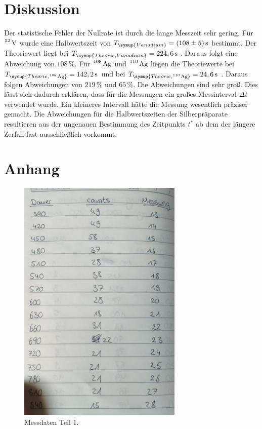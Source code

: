 \section{Diskussion}
\label{sec:Diskussion}
Der statistische Fehler der Nullrate ist durch die lange Messzeit sehr gering. Für $\ce{^52 V}$ wurde eine
Halbwertszeit von $T_{\symup{Vanadium}} = (108 \pm 5)\,\unit{\second}$ bestimmt. Der Theoriewert liegt bei
$T_{\symup{Theorie, Vanadium}} = 224,6\,\unit{\second}$ \cite{periodensystem}. Daraus folgt eine Abweichung
von $108\,\%$. Für $\ce{^108 Ag}$ und $\ce{^110 Ag}$ liegen die Theoriewerte bei
$T_{\symup{Theorie, \ce{^108 Ag}}} = 142,2\,\unit{\second}$ und bei
$T_{\symup{Theorie, \ce{^110 Ag}}} = 24,6\,\unit{\second}$ \cite{periodensystem}. Daraus folgen Abweichungen von
$219\,\%$ und $65\,\%$. Die Abweichungen sind sehr groß. Dies lässt sich dadurch erklären, dass für die Messungen
ein großes Messinterval $\Delta t$ verwendet wurde. Ein kleineres Intervall hätte die Messung wesentlich präziser
gemacht. Die Abweichungen für die Halbwertszeiten der Silberpräparate resultieren aus der ungenauen Bestimmung
des Zeitpunkts $t^*$ ab dem der längere Zerfall fast ausschließlich vorkommt.

\section{Anhang}
\label{sec:Anhang}
\begin{figure}
    \centering
    \includegraphics[width=0.7\textwidth]{Bilder/1.jpeg}
    \caption{Messdaten Teil 1.}
    \label{fig:M1}
\end{figure}

